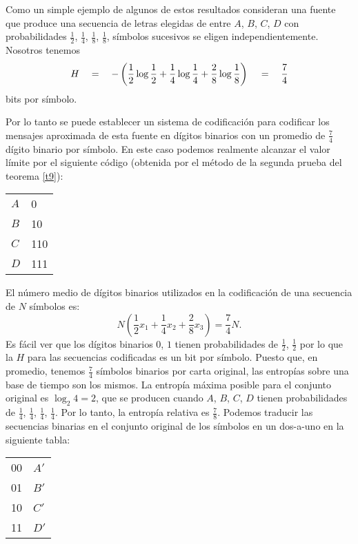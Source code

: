 Como un simple ejemplo de algunos de estos resultados consideran una
fuente que produce una secuencia de letras elegidas de entre $A$, $B$,
$C$, $D$ con probabilidades $\frac{1}{2}$, $\frac{1}{4}$,
$\frac{1}{8}$, $\frac{1}{8}$, s\'imbolos sucesivos se eligen
independientemente. Nosotros tenemos
\begin{equation}
H \quad = \quad -\left(\frac{1}{2} \log \frac{1}{2} + \frac{1}{4} \log \frac{1}{4} + \frac{2}{8} \log \frac{1}{8}\right) \\
\quad = \quad \frac{7}{4}
\end{equation}
bits por s\'imbolo.

Por lo tanto se puede establecer un sistema de codificaci\'on para
codificar los mensajes aproximada de esta fuente en d\'igitos binarios
con un promedio de $\frac{7}{4}$ d\'igito binario por s\'imbolo. En
este caso podemos realmente alcanzar el valor l\'imite por el
siguiente c\'odigo (obtenida por el m\'etodo de la segunda prueba del
teorema \ref{t9}):

\begin{tabular}{ll}
 $A$ & 0 \\
 $B$ & 10\\
 $C$ & 110\\
 $D$ & 111
\end{tabular}

El n\'umero medio de d\'igitos binarios utilizados en la codificaci\'on de una secuencia de $N$ s\'imbolos es:
\begin{equation}
N \left(\frac{1}{2} x_1 + \frac{1}{4} x_2 + \frac{2}{8} x_3\right) 
= \frac{7}{4}N.
\end{equation}
Es f\'acil ver que los d\'igitos binarios $0$, $1$ tienen
probabilidades de $\frac{1}{2}$, $\frac{1}{2}$ por lo que la $H$ para
las secuencias codificadas es un bit por s\'imbolo. Puesto que, en
promedio, tenemos $\frac{7}{4}$ s\'imbolos binarios por carta
original, las entrop\'ias sobre una base de tiempo son los mismos. La
entrop\'ia m\'axima posible para el conjunto original es $\log_2 4 =
2$, que se producen cuando $A$, $B$, $C$, $D$ tienen probabilidades de
$\frac{1}{4}$, $\frac{1}{4}$, $\frac{1}{4}$, $\frac{1}{4}$. Por lo
tanto, la entrop\'ia relativa es $\frac{7}{8}$. Podemos traducir las
secuencias binarias en el conjunto original de los s\'imbolos en un
dos-a-uno en la siguiente tabla:

\begin{tabular}{ll}
00  &	$A'$\\
01	&	$B'$\\
10	&	$C'$\\
11	&	$D'$\\
\end{tabular}

